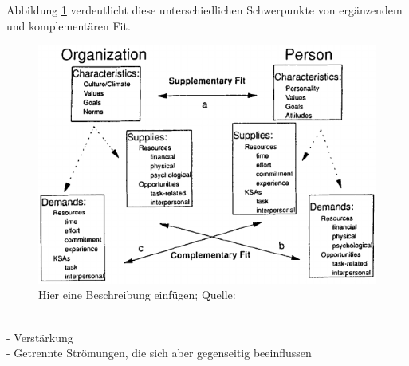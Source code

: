 Abbildung \ref{fig:personEnvironmentFit:supplementaryUndComplementary:abb1} verdeutlicht diese unterschiedlichen Schwerpunkte von ergänzendem und komplementären Fit.\\
\begin{figure}[h]
	\centering
	\includegraphics[width=1\textwidth]{gfx/supplementaryComplementaryFit.png}
	\caption{Hier eine Beschreibung einfügen; Quelle: \cite[S. 4]{kristof:1996}}
	\label{fig:personEnvironmentFit:supplementaryUndComplementary:abb1}
\end{figure}
\\

- Verstärkung\\
- Getrennte Strömungen, die sich aber gegenseitig beeinflussen

